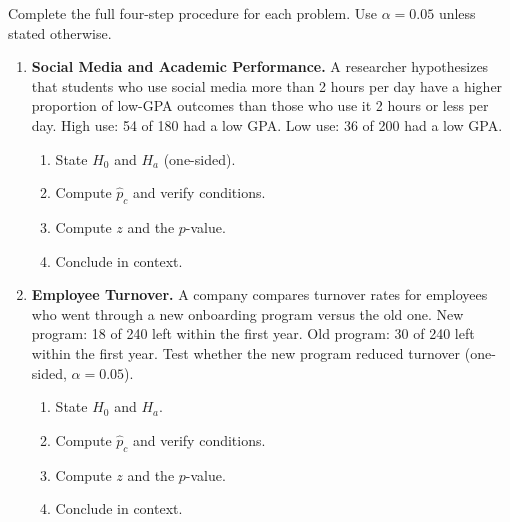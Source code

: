 \documentclass[10pt]{article}
\begin{document}
\namedateperiod

\vspace{0.15in}

Complete the full four-step procedure for each problem. Use $\alpha = 0.05$ unless stated otherwise.

\begin{enumerate}

\item \textbf{Social Media and Academic Performance.} A researcher hypothesizes that
students who use social media more than 2 hours per day have a higher proportion of
low-GPA outcomes than those who use it 2 hours or less per day.
High use: 54 of 180 had a low GPA.
Low use: 36 of 200 had a low GPA.

\begin{enumerate}[label=\alph*.]
  \item State $H_0$ and $H_a$ (one-sided). 
  \item Compute $\hat p_c$ and verify conditions. 
  \item Compute $z$ and the $p$-value. 
  \item Conclude in context. 
\end{enumerate}

\item \textbf{Employee Turnover.} A company compares turnover rates for employees who
went through a new onboarding program versus the old one.
New program: 18 of 240 left within the first year.
Old program: 30 of 240 left within the first year.
Test whether the new program reduced turnover (one-sided, $\alpha=0.05$).

\begin{enumerate}[label=\alph*.]
  \item State $H_0$ and $H_a$. 
  \item Compute $\hat p_c$ and verify conditions. 
  \item Compute $z$ and the $p$-value. 
  \item Conclude in context. 
\end{enumerate}

\end{enumerate}
\end{document}
